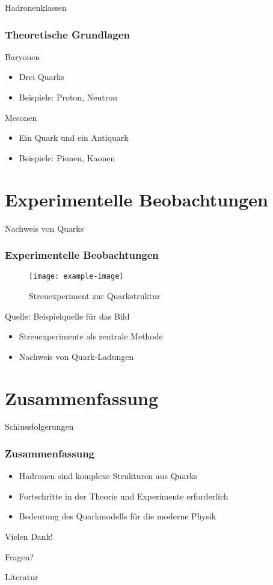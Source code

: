 \documentclass[aspectratio=169]{beamer} %
\begin{document}
	\begin{frame}{Hadronenklassen}
		\frametitle{Theoretische Grundlagen}
		\begin{block}{Baryonen}
			\begin{itemize}
				\item Drei Quarks
				\item Beispiele: Proton, Neutron
			\end{itemize}
		\end{block}
		\begin{block}{Mesonen}
			\begin{itemize}
				\item Ein Quark und ein Antiquark
				\item Beispiele: Pionen, Kaonen
			\end{itemize}
		\end{block}
	\end{frame}
	
	\section{Experimentelle Beobachtungen}
	\begin{frame}{Nachweis von Quarks}
		\frametitle{Experimentelle Beobachtungen}
		\begin{figure}
			\centering
			\texttt{[image: example-image]} %
			\caption{Streuexperiment zur Quarkstruktur}
		\end{figure}
		\vfill
		\tiny Quelle: Beispielquelle für das Bild
		\begin{itemize}
			\item Streuexperimente als zentrale Methode
			\item Nachweis von Quark-Ladungen
		\end{itemize}
	\end{frame}
	
	\section{Zusammenfassung}
	\begin{frame}{Schlussfolgerungen}
		\frametitle{Zusammenfassung}
		\begin{itemize}
			\item Hadronen sind komplexe Strukturen aus Quarks
			\item Fortschritte in der Theorie und Experimente erforderlich
			\item Bedeutung des Quarkmodells für die moderne Physik
		\end{itemize}
	\end{frame}
	
	\begin{frame}{Vielen Dank!}
		\begin{center}
			\Huge Fragen?
		\end{center}
	\end{frame}
	
	\begin{frame}[allowframebreaks]{Literatur}
		\printbibliography
	\end{frame}
	
\end{document}
